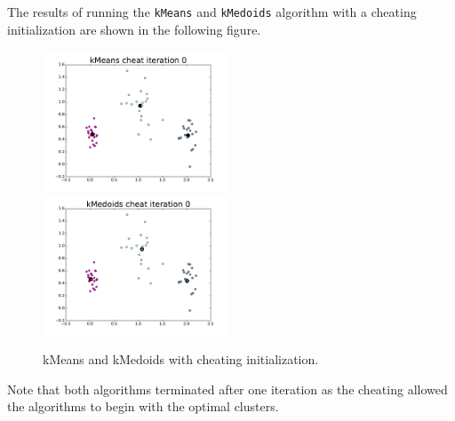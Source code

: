 \documentclass[12pt]{article}
\begin{document}
The results of running the \texttt{kMeans} and \texttt{kMedoids} algorithm with a cheating initialization are shown in the following figure.
\begin{figure}[h]
        \begin{center}
                \includegraphics[width=0.495\textwidth]{kMeanscheatiteration0}
                \includegraphics[width=0.495\textwidth]{kMedoidscheatiteration0}
                \caption{kMeans and kMedoids with cheating initialization.}
        \end{center}
\end{figure}
Note that both algorithms terminated after one iteration as the cheating allowed the algorithms to begin with the optimal clusters.
\end{document}
